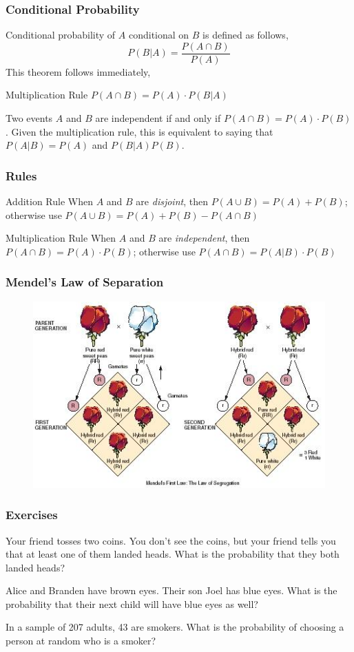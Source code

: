 \documentclass[xcolor=dvipsnames]{beamer}
\begin{document}
\begin{frame}
  \frametitle{Conditional Probability}
Conditional probability of $A$ conditional on $B$ is defined as follows,
\begin{equation}
  \label{eq:iekeengi}
  P(B|A)=\frac{P(A\cap{}B)}{P(A)}
\end{equation}
This theorem follows immediately,
\begin{block}{Multiplication Rule}
  $P(A\cap{}B)=P(A)\cdot{}P(B|A)$
\end{block}
Two events $A$ and $B$ are \alert{independent} if and only if
$P(A\cap{}B)=P(A)\cdot{}P(B)$. Given the multiplication rule, this is
equivalent to saying that $P(A|B)=P(A)$ and $P(B|A)P(B)$.
\end{frame}

\begin{frame}
  \frametitle{Rules}
  \begin{block}{Addition Rule}
    When $A$ and $B$ are \emph{disjoint}, then
    $P(A\cup{}B)=P(A)+P(B)$; otherwise use
    $P(A\cup{}B)=P(A)+P(B)-P(A\cap{}B)$
\end{block}
\bigskip
\begin{block}{Multiplication Rule}
  When $A$ and $B$ are \emph{independent}, then
  $P(A\cap{}B)=P(A)\cdot{}P(B)$; otherwise use
  $P(A\cap{}B)=P(A|B)\cdot{}P(B)$
\end{block}
\end{frame}

\begin{frame}
  \frametitle{Mendel's Law of Separation}
\begin{figure}[h]
\includegraphics[scale=.75]{./diagrams/mendel.jpg}
\end{figure}
\end{frame}

\begin{frame}
  \frametitle{Exercises}
{\ubung} Your friend tosses two coins. You don't see the
coins, but your friend tells you that at least one of them landed
heads. What is the probability that they both landed heads?

{\ubung} Alice and Branden have brown eyes. Their son Joel has blue
eyes. What is the probability that their next child will have blue
eyes as well?

{\ubung} In a sample of 207 adults, 43 are smokers. What
is the probability of choosing a person at random who is a smoker?
\end{frame}
\end{document}
